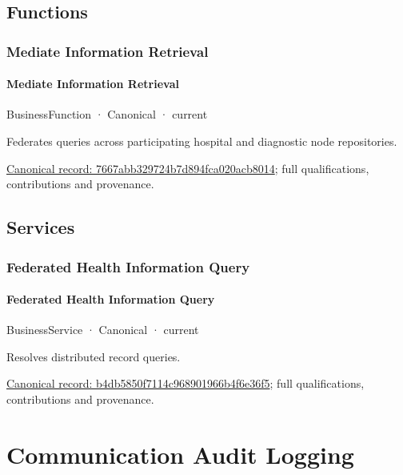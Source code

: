 \subsection{Functions}

\subsubsection{Mediate Information Retrieval}

\paragraph{Mediate Information Retrieval}

\label{element:7667abb329724b7d894fca020acb8014}
{\small BusinessFunction · Canonical · current}\par

Federates queries across participating hospital and diagnostic node repositories.


{\footnotesize \href{../../../../continuum/business/business-function/7667abb329724b7d894fca020acb8014.md}{Canonical record: 7667abb329724b7d894fca020acb8014}; full qualifications, contributions and provenance.}\par
\subsection{Services}

\subsubsection{Federated Health Information Query}

\paragraph{Federated Health Information Query}

\label{element:b4db5850f7114c968901966b4f6e36f5}
{\small BusinessService · Canonical · current}\par

Resolves distributed record queries.


{\footnotesize \href{../../../../continuum/business/business-service/b4db5850f7114c968901966b4f6e36f5.md}{Canonical record: b4db5850f7114c968901966b4f6e36f5}; full qualifications, contributions and provenance.}\par
\section{Communication Audit Logging}

